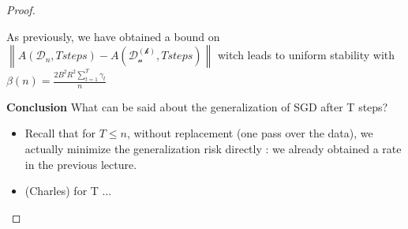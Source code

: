 \begin{proof}
\begin{itemize}
        
        As previously, we have obtained a bound on $\left\| A(\mathcal{D}_n, T steps) - A(\mathcal{D_n^{(k)}}, T steps) \right\| $ witch leads to uniform stability with $\beta (n) = \frac{2B^2R^2 \sum_{t=1}^{T}\gamma _t}{n}$

        \textbf{Conclusion} What can be said about the generalization of SGD after T steps?
        \begin{itemize}
            \item Recall that for $T \leq n$, without replacement (one pass over the data), we actually minimize the generalization risk directly : we already obtained a rate in the previous lecture. 
            \item  (Charles) for T ...
        \end{itemize}
        
        
    \end{itemize}
\end{proof}